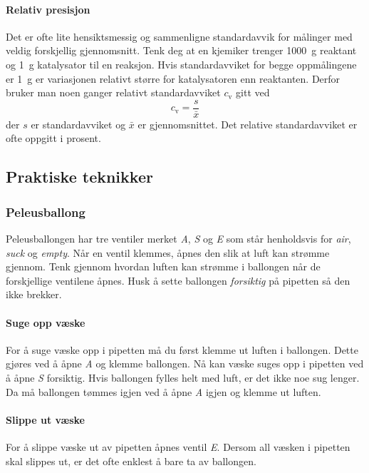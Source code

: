 	\paragraph{Relativ presisjon}
	Det er ofte lite hensiktsmessig og sammenligne standardavvik for målinger med veldig forskjellig gjennomsnitt. Tenk deg at en kjemiker trenger \SI{1000}{g} reaktant og \SI{1}{g} katalysator til en reaksjon. Hvis standardavviket for begge oppmålingene er \SI{1}{g} er variasjonen relativt større for katalysatoren enn reaktanten. Derfor bruker man noen ganger relativt standardavviket $c_\mathrm{v}$ gitt ved
	\begin{equation*}
		c_\mathrm{v}=\frac{s}{\bar{x}}
	\end{equation*}
	der $s$ er standardavviket og $\bar{x}$ er gjennomsnittet. Det relative standardavviket er ofte oppgitt i prosent.
		
	\subsection{Praktiske teknikker}
	
	\subsubsection{Peleusballong}
	Peleusballongen har tre ventiler merket \emph{A}, \emph{S} og \emph{E} som står henholdsvis for \emph{air}, \emph{suck} og \emph{empty}. Når en ventil klemmes, åpnes den slik at luft kan strømme gjennom. Tenk gjennom hvordan luften kan strømme i ballongen når de forskjellige ventilene åpnes. Husk å sette ballongen \emph{forsiktig} på pipetten så den ikke brekker.
	
	\paragraph{Suge opp væske}
	For å suge væske opp i pipetten må du først klemme ut luften i ballongen. Dette gjøres ved å åpne \emph{A} og klemme ballongen. Nå kan væske suges opp i pipetten ved å åpne \emph{S} forsiktig. Hvis ballongen fylles helt med luft, er det ikke noe sug lenger. Da må ballongen tømmes igjen ved å åpne \emph{A} igjen og klemme ut luften.
	
	\paragraph{Slippe ut væske}
	For å slippe væske ut av pipetten åpnes ventil \emph{E}. Dersom all væsken i pipetten skal slippes ut, er det ofte enklest å bare ta av ballongen.\\[\parskip]
	
